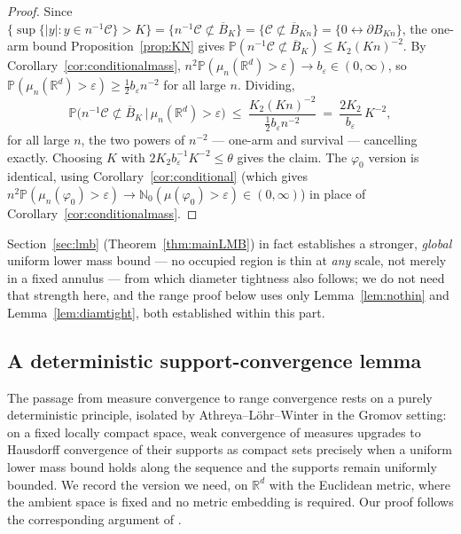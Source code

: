 \documentclass[11pt]{article}
\theoremstyle{definition}
\theoremstyle{remark}
\newcommand{\R}{\mathbb{R}}
\newcommand{\bP}{\mathbb{P}}
\newcommand{\bN}{{\mathbb{N}_0}}                 %
\newcommand{\eps}{\varepsilon}
\numberwithin{equation}{section}
\theoremstyle{plain}
\theoremstyle{definition}
\theoremstyle{remark}
\theoremstyle{plain}
\begin{document}
\begin{proof}
Since $\{\sup\{|y|:y\in n^{-1}\mathcal C\}>K\}=\{n^{-1}\mathcal C\not\subset\overline B_K\}=\{\mathcal C\not\subset
\overline B_{Kn}\}=\{0\leftrightarrow\partial B_{Kn}\}$, the one-arm bound
Proposition~\ref{prop:KN} gives
$\bP(n^{-1}\mathcal C\not\subset\overline B_K)\le K_2(Kn)^{-2}$. By
Corollary~\ref{cor:conditionalmass}, $n^2\bP(\mu_n(\R^d)>\eps)\to b_\eps\in
(0,\infty)$, so $\bP(\mu_n(\R^d)>\eps)\ge\tfrac12 b_\eps n^{-2}$ for all large
$n$. Dividing,
\[
\bP\bigl(n^{-1}\mathcal C\not\subset\overline B_K\,\big|\,\mu_n(\R^d)>\eps\bigr)
\ \le\ \frac{K_2(Kn)^{-2}}{\tfrac12 b_\eps n^{-2}}
\ =\ \frac{2K_2}{b_\eps}\,K^{-2},
\]
for all large $n$, the two powers of $n^{-2}$ --- one-arm and survival
--- cancelling exactly. Choosing $K$ with $2K_2 b_\eps^{-1}K^{-2}\le
\theta$ gives the claim. The $\varphi_0$ version is identical, using
Corollary~\ref{cor:conditional} (which gives
$n^2\bP(\mu_n(\varphi_0)>\eps)\to\bN(\mu(\varphi_0)>\eps)\in(0,\infty)$) in place
of Corollary~\ref{cor:conditionalmass}.
\end{proof}

Section~\ref{sec:lmb} (Theorem~\ref{thm:mainLMB}) in fact establishes a stronger, \emph{global} uniform
lower mass bound --- no occupied region is thin at \emph{any} scale, not merely
in a fixed annulus --- from which diameter tightness also follows; we do not
need that strength here, and the range proof below uses only
Lemma~\ref{lem:nothin} and Lemma~\ref{lem:diamtight}, both established within
this part.

\subsection{A deterministic support-convergence lemma}

The passage from measure convergence to range convergence rests on a
purely deterministic principle, isolated by Athreya--L\"ohr--Winter
\cite{ALW16} in the Gromov setting: on a fixed locally compact space, weak
convergence of measures upgrades to Hausdorff convergence of their
supports as compact sets precisely when a uniform lower mass bound holds
along the sequence and the supports remain uniformly bounded.
We record the version we need, on $\R^d$ with the Euclidean metric, where the
ambient space is fixed and no metric embedding is required. Our proof
follows the corresponding argument of \cite{ALW16}.
\end{document}
